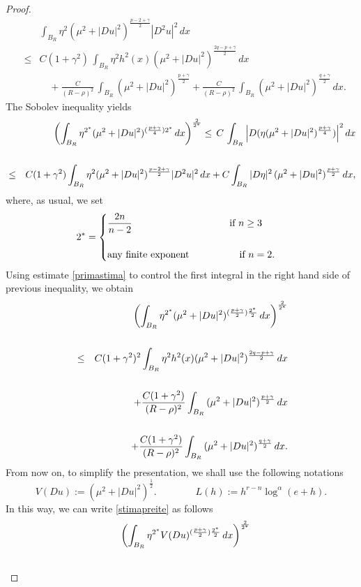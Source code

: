 \documentclass[12pt]{amsart}
\theoremstyle{definition}
\numberwithin{equation}{section}
\numberwithin{equation}{section}
\begin{document}
{\begin{proof}
 
\begin{eqnarray}
&& \int_{B_{{R}}} \eta^2 (\mu^2 + |Du|^2)^{\frac{p-2 + \gamma}{2}}  |D^2 u|^2 \, dx \label{primastima} \\[2mm] 
&\le & C (1+\gamma^2) \, \int_{B_{{R}}} \eta^2h^2(x) (\mu^2 + |Du|^2)^{\frac{2q-p + \gamma}{2}}  \, dx \nonumber\\[2mm]
&&\quad+  \frac{C}{({R-\rho})^2}  \, \int_{B_{{R}}}   (\mu^2 + |Du|^2)^{\frac{p + \gamma}{2}}  +  \frac{C}{({R- \rho})^2}  \, \int_{B_{{R}}}   (\mu^2 + |Du|^2)^{\frac{q + \gamma}{2}} \, dx.\nonumber
\end{eqnarray}
The Sobolev  inequality yields
\begin{eqnarray*}
&&\left ( \int_{B_{{R}}}  \eta^{2^*}(\mu^2 + |Du|^2)^{(\frac{p + \gamma}{4}) 2^*}\, dx\right )^{\frac{2}{2^*}} \le \, C \, \int_{B_{{R}}} \Big|D (\eta(\mu^2 + |Du|^2)^{\frac{p + \gamma}{4}})\Big|^2 \, dx 	\cr\cr
&\le&C(1+\gamma^2)\int_{B_{{R}}} \eta^2 (\mu^2 + |Du|^2)^{\frac{p-2 + \gamma}{2}}  |D^2 u|^2\,dx+C \int_{B_{{R}}} |D \eta|^2 \,  (\mu^2 + |Du|^2)^{\frac{p + \gamma}{2}}  \, dx,
\end{eqnarray*}
where, as usual, we set
$$ 2^*=\begin{cases}
	\displaystyle{\frac{2n}{n-2}}\qquad\qquad\qquad\qquad\qquad \text{if}\,\,n\ge3\cr\cr
	\text{any finite exponent}\, \qquad\quad\qquad \text{if}\,\,n=2.
	\end{cases}$$
	Using estimate \eqref{primastima} to control the first integral in the right hand side of previous inequality, we obtain
\begin{eqnarray}\label{stimapreite}
&&\left ( \int_{B_{{R}}}  \eta^{2^*}(\mu^2 + |Du|^2)^{(\frac{p + \gamma}{2}) \frac{2^*}{2}}\, dx\right )^{\frac{2}{2^*}} 	\cr\cr
&\le& C (1+\gamma^2)^2 \int_{B_{{R}}} \eta^2 h^2(x) (\mu^2 + |Du|^2)^{\frac{2q-p + \gamma}{2}}  \, dx \cr\cr
&&+\frac{C(1+\gamma^2)}{({R - \rho})^{2}} \int_{B_{{R}}}  \,  (\mu^2 + |Du|^2)^{\frac{p + \gamma}{2}}  \, dx\cr\cr
&&+\frac{C(1+\gamma^2)}{({R - \rho})^{2}} \int_{B_{{R}}}  \,  (\mu^2 + |Du|^2)^{\frac{q + \gamma}{2}} \, dx.
\end{eqnarray}
From now on, to simplify the presentation, we shall use the following notations
\begin{equation}\label{defLV}
 V(Du):=(\mu^2+|Du|^2)^{\frac{1}{2}}. \qquad \qquad L(h):= h^{r-n}\log^{\alpha}(e+h).   
\end{equation}
In this way, we can write  \eqref{stimapreite} as follows
\begin{eqnarray}\label{stimapreitebis}
&&\left ( \int_{B_{{R}}}  \eta^{2^*}V(Du)^{(\frac{p+\gamma}{2})\frac{2^*}{2}}\, dx\right )^{\frac{2}{2^*}} 	\cr\cr

\end{eqnarray}
\end{proof}}
\end{document}
